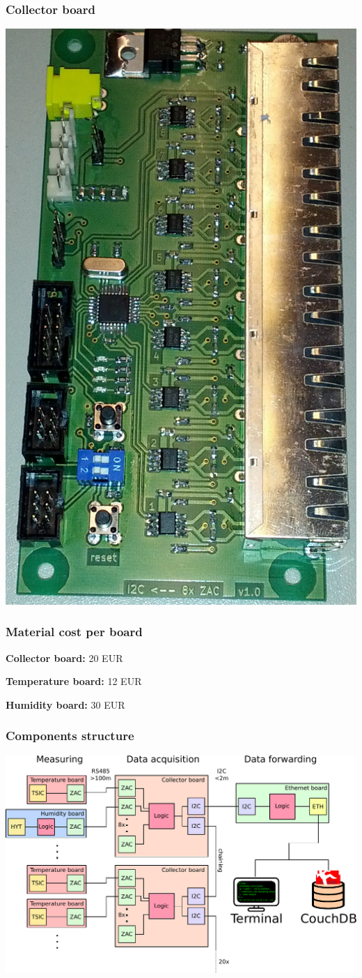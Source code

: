 \documentclass[t]{beamer}
\begin{document}
\begin{frame}[c]
    \frametitle{Collector board}
  \begin{center}
  	\includegraphics[width=0.4\linewidth]{img/pic/collector_geloetet.jpg}\\
  \vspace{0.5cm}
  \end{center}
\end{frame}
\begin{frame}[c]
    \frametitle{Material cost per board}
		\begin{description}
			\item{\textbf{Collector board:}} 20 EUR
			\item{\textbf{Temperature board:}} 12 EUR
			\item{\textbf{Humidity board:}} 30 EUR
		\end{description}
\end{frame}
\begin{frame}[c]
    \frametitle{Components structure}
  \begin{center}
  	\includegraphics[width=0.9\linewidth]{img/plan2_color_db.pdf}\\
  \vspace{0.5cm}
  \end{center}
\end{frame}
\end{document}
